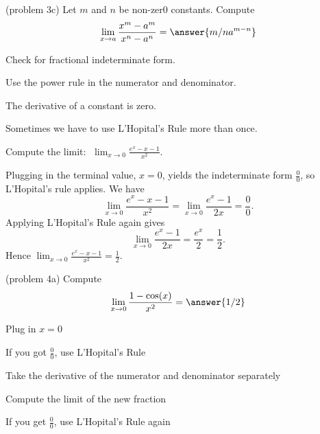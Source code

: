 \documentclass{ximera}
\begin{document}
\begin{problem}(problem 3c)
  Let $m$ and $n$ be non-zer0 constants. Compute
  \[
  \lim_{x \to a} \frac{x^m - a^m}{x^n - a^n} = \answer{m/n a^{m-n}}
  \]
  
    \begin{hint}
      Check for fractional indeterminate form.
    \end{hint}
    \begin{hint}
      Use the power rule in the numerator and denominator.
    \end{hint}
	  \begin{hint}
      The derivative of a constant is zero.
    \end{hint}
  
\end{problem}



Sometimes we have to use L'Hopital's Rule more than once.

\begin{example}[example 4]
Compute the limit:  $\displaystyle{\;\lim_{x \to 0} \frac{e^x - x - 1}{x^2}}.$

Plugging in the terminal value, $x=0$, yields 
the indeterminate form $\frac00$, so L'Hopital's rule applies.
We have 
\[\lim_{x \to 0} \frac{e^x - x - 1}{x^2} = \lim_{x \to 0} \frac{e^x -1}{2x} = \frac{0}{0}.\]
Applying L'Hopital's Rule again gives
\[\lim_{x \to 0} \frac{e^x -1}{2x} = \frac{e^x}{2} = \frac{1}{2}.\]
Hence $\displaystyle{\lim_{x \to 0} \frac{e^x - x - 1}{x^2} = \frac 12}.$
\end{example}


\begin{problem}(problem 4a)
  Compute
  \[
  \lim_{x \to 0} \frac{1 - \cos(x)}{x^2} = \answer{1/2}
  \]
  
    \begin{hint}
      Plug in $x=0$
    \end{hint}
    \begin{hint}
      If you got $\frac00$, use L'Hopital's Rule
    \end{hint}
    \begin{hint}
      Take the derivative of the numerator and denominator separately
    \end{hint}
	  \begin{hint}
      Compute the limit of the new fraction
    \end{hint}
		\begin{hint}
		 If you get $\frac00$, use L'Hopital's Rule again
    \end{hint}

	
\end{problem}
\end{document}

